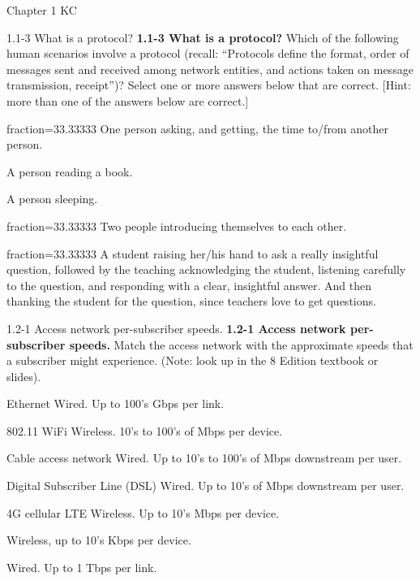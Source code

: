 \documentclass[a4paper]{article}
\begin{document}
\begin{quiz}{Chapter 1 KC}

\begin{multi}[points=1,shuffle=true,multiple]{1.1-3 What is a protocol?}
\textbf{1.1-3 What is a protocol?} 
Which of the following human scenarios involve a protocol 
(recall: ``Protocols define the format, order of messages sent and received among network entities, and actions taken on message transmission, receipt'')? 
Select one or more answers below that are correct. [Hint: more than one of the answers below are correct.]

\item[fraction=33.33333] One person asking, and getting, the time to/from another person.
\item A person reading a book.
\item A person sleeping.
\item[fraction=33.33333] Two people introducing themselves to each other.
\item[fraction=33.33333] A student raising her/his hand to ask a really insightful question, followed by the teaching acknowledging the student, listening carefully to the question, and responding with a clear, insightful answer.  And then thanking the student for the question, since teachers love to get questions.
\end{multi}

\begin{matching}[points=1,shuffle=true]{1.2-1 Access network per-subscriber speeds.}
\textbf{1.2-1 Access network per-subscriber speeds.}
Match the access network with the approximate speeds that a subscriber might experience. 
(Note: look up in the 8 Edition textbook or slides).

\item Ethernet \answer Wired. Up to 100's Gbps per link.
\item 802.11 WiFi \answer Wireless. 10's to 100's of Mbps per device.
\item Cable access network \answer Wired. Up to 10's to 100's of Mbps downstream per user.
\item Digital Subscriber Line (DSL) \answer Wired. Up to 10's of Mbps downstream per user.
\item 4G cellular LTE \answer Wireless. Up to 10's Mbps per device.
\item \answer Wireless, up to 10's Kbps per device.
\item \answer Wired. Up to 1 Tbps per link.
\end{matching}


\end{quiz}
\end{document}
